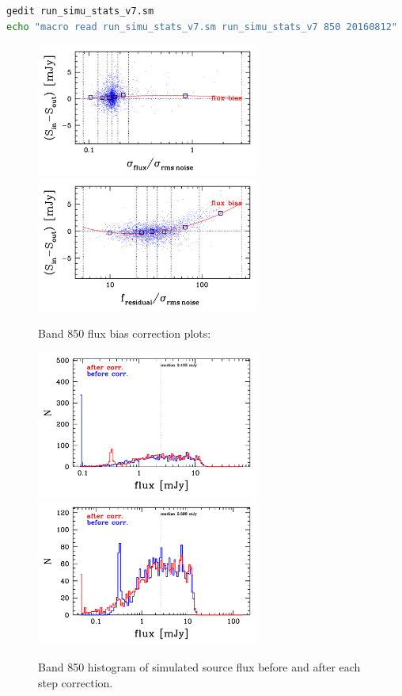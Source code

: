 \documentclass[11pt,a4paper]{article}
\begin{document}
\begin{lstlisting}[language=bash]
gedit run_simu_stats_v7.sm
echo "macro read run_simu_stats_v7.sm run_simu_stats_v7 850 20160812" | sm
\end{lstlisting}

\begin{figure}[H]
	\caption{
		Band 850 flux bias correction plots:
	}
	\includegraphics[width=0.65\textwidth]{galsim_850_fbias_1}
	\includegraphics[width=0.65\textwidth]{galsim_850_fbias_2}
\end{figure}

\begin{figure}[H]
	\caption{
		Band 850 histogram of simulated source flux before and after each step correction. 
	}
	\includegraphics[width=0.65\textwidth]{galsim_850_hist_flux_1}
	\includegraphics[width=0.65\textwidth]{galsim_850_hist_flux_2}
\end{figure}
\end{document}
